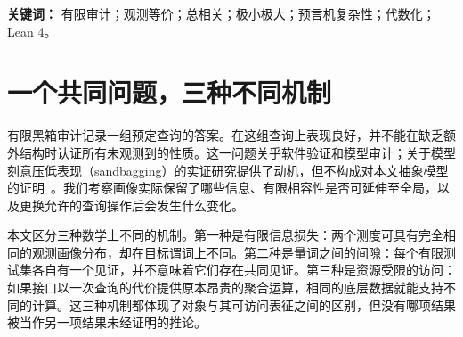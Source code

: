 \documentclass[11pt,a4paper]{article}
\newcommand{\TC}{\operatorname{TC}}
\newcommand{\bits}{\{0,1\}}
\newcommand{\PP}{\mathsf{P}}
\newcommand{\NP}{\mathsf{NP}}
\newcommand{\UP}{\mathsf{UP}}
\newcommand{\Atil}{\widetilde A}
\newcommand{\paperhead}[3]{\begin{center}\vspace*{2mm}{\LARGE\bfseries\color{ink}#1\par}\vspace{4mm}{\large #2\par}\vspace{2mm}{\small #3\par}\end{center}\vspace{3mm}}
\begin{document}
\paperhead{有限黑箱审计的信息论盲点}{审计画像的精确混叠、相关性界与部分经 Lean 形式化的预言机分离}{修订预印本 v2.0 \quad | \quad 2026 年 11 月 25 日}
\begin{abstract}
当被审计对象由许多可能相互依赖的行为坐标描述时，一组固定的有限二元测试能够认证什么？设 $N=2M$ 位配置 $B$ 的各个二位块的边缘分布均匀，确定性审计画像为 $V=\alpha(B)\in\bits^m$，总相关为 $\TC(B)$。我们证明，存在一个支撑于原支持集的分布，既保持 $V$ 的整个联合分布，又能将至少一个块内逻辑或谓词的成功概率从 $3/4$ 降至至多 $2(m+\TC(B))/(N(2-\log_2 3))$。我们利用二元熵收紧这一界，并以能否通过审计画像分解来刻画给定谓词族的精确认证。一个独立的无限序列模型展示了有限观测下持续存在的歧义，以及在可数可加测度下达到最大值的极小极大间隙。最后，在 Aaronson 与 Wigderson 的非对称代数化模型中，我们给出一个直接的预言机构造：由唯一确定的多重线性延拓提供一次查询的聚合操作，且
\[
\PP^A\subsetneq\UP^A=\NP^A\subseteq\PP^{\Atil[\mathrm{poly}]}.
\]
结合已知的两个端点预言机，每个有限观测柱集中均可实现全部三种容许的非对称画像。代数与对角化组件由分别编译的 Lean 4.36.0 模块支持；集成根定理与标准机器模型的适切性仍未纳入已核查的组合证明。对大型语言模型（LLM）审计的推论以指定的行为模型及备选分布的可实现性为前提。本文不声称进行了 LLM 实验，也不声称解决了 $\PP$ 与 $\NP$ 的关系问题。
\end{abstract}
\noindent\textbf{关键词：} 有限审计；观测等价；总相关；极小极大；预言机复杂性；代数化；Lean 4。

\section{一个共同问题，三种不同机制}
有限黑箱审计记录一组预定查询的答案。在这组查询上表现良好，并不能在缺乏额外结构时认证所有未观测到的性质。这一问题关乎软件验证和模型审计；关于模型刻意压低表现（sandbagging）的实证研究提供了动机，但不构成对本文抽象模型的证明~\cite{taylor}。我们考察画像实际保留了哪些信息、有限相容性是否可延伸至全局，以及更换允许的查询操作后会发生什么变化。

本文区分三种数学上不同的机制。第一种是有限信息损失：两个测度可具有完全相同的观测画像分布，却在目标谓词上不同。第二种是量词之间的间隙：每个有限测试集各自有一个见证，并不意味着它们存在共同见证。第三种是资源受限的访问：如果接口以一次查询的代价提供原本昂贵的聚合运算，相同的底层数据就能支持不同的计算。这三种机制都体现了对象与其可访问表征之间的区别，但没有哪项结果被当作另一项结果未经证明的推论。
\end{document}
